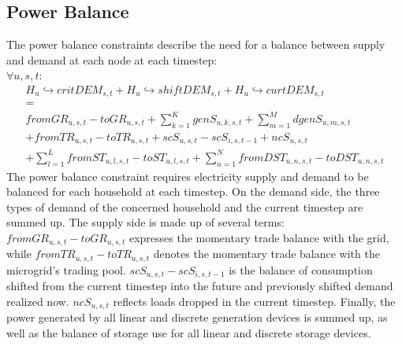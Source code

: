 \documentclass[
	11pt,								%
	DIV10,								%
	a4paper,         					%
	oneside,							%
	headheight=20pt,					%
	footheight=20pt,					%
    parskip=full,						%
    listof=totoc,						%
	bibliography=totoc,					%
	index=totoc,						%
]{scrartcl}
\begin{document}
\subsection{Power Balance}
The power balance constraints describe the need for a balance between supply and demand at each node at each timestep: 
\\
$\forall u,s,t$:
\begin{equation}
	\begin{split}
		H_u\hookrightarrow  critDEM_{s,t} + H_u\hookrightarrow  shiftDEM_{s,t} + H_u\hookrightarrow  curtDEM_{s,t}\\
		= \\
		fromGR_{u,s,t} - toGR_{u,s,t} + \sum_{k=1}^K{genS_{u,k,s,t}} + \sum_{m=1}^M{dgenS_{u,m,s,t}} \\ 
		+ fromTR_{u,s,t} - toTR_{u,s,t} + scS_{u,s,t} - scS_{i,s,t-1} + ncS_{u,s,t} \\
		+ \sum_{l=1}^L{fromST_{u,l,s,t} - toST_{u,l,s,t}} + \sum_{n=1}^N{fromDST_{u,n,s,t}-toDST_{u,n,s,t}}
	\end{split}
\end{equation}
The power balance constraint requires electricity supply and demand to be balanced for each household at each timestep. On the demand side, the three types of demand of the concerned household and the current timestep are summed up. The supply side is made up of several terms: \\
$fromGR_{u,s,t} - toGR_{u,s,t}$ expresses the momentary trade balance with the grid, while $fromTR_{u,s,t} - toTR_{u,s,t}$ denotes the momentary trade balance with the microgrid's trading pool. $scS_{u,s,t} - scS_{i,s,t-1}$ is the balance of consumption shifted from the current timestep into the future and previously shifted demand realized now. $ncS_{u,s,t}$ reflects loads dropped in the current timestep. Finally, the power generated by all linear and discrete generation devices is summed up, as well as the balance of storage use for all linear and discrete storage devices.
\end{document}
